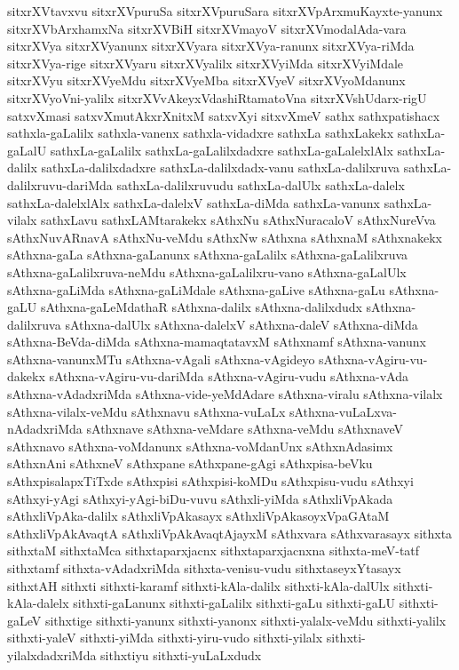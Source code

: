 {sitxrXVtavxvu
sitxrXVpuruSa
sitxrXVpuruSara
sitxrXVpArxmuKayxte-yanunx
sitxrXVbArxhamxNa
sitxrXVBiH
sitxrXVmayoV
sitxrXVmodalAda-vara
sitxrXVya
sitxrXVyanunx
sitxrXVyara
sitxrXVya-ranunx
sitxrXVya-riMda
sitxrXVya-rige
sitxrXVyaru
sitxrXVyalilx
sitxrXVyiMda
sitxrXVyiMdale
sitxrXVyu
sitxrXVyeMdu
sitxrXVyeMba
sitxrXVyeV
sitxrXVyoMdanunx
sitxrXVyoVni-yalilx
sitxrXVvAkeyxVdashiRtamatoVna
sitxrXVshUdarx-rigU
satxvXmasi
satxvXmutAkxrXnitxM
satxvXyi
sitxvXmeV
sathx
sathxpatishacx
sathxla-gaLalilx
sathxla-vanenx
sathxla-vidadxre
sathxLa
sathxLakekx
sathxLa-gaLalU
sathxLa-gaLalilx
sathxLa-gaLalilxdadxre
sathxLa-gaLalelxlAlx
sathxLa-dalilx
sathxLa-dalilxdadxre
sathxLa-dalilxdadx-vanu
sathxLa-dalilxruva
sathxLa-dalilxruvu-dariMda
sathxLa-dalilxruvudu
sathxLa-dalUlx
sathxLa-dalelx
sathxLa-dalelxlAlx
sathxLa-dalelxV
sathxLa-diMda
sathxLa-vanunx
sathxLa-vilalx
sathxLavu
sathxLAMtarakekx
sAthxNu
sAthxNuracaloV
sAthxNureVva
sAthxNuvARnavA
sAthxNu-veMdu
sAthxNw
sAthxna
sAthxnaM
sAthxnakekx
sAthxna-gaLa
sAthxna-gaLanunx
sAthxna-gaLalilx
sAthxna-gaLalilxruva
sAthxna-gaLalilxruva-neMdu
sAthxna-gaLalilxru-vano
sAthxna-gaLalUlx
sAthxna-gaLiMda
sAthxna-gaLiMdale
sAthxna-gaLive
sAthxna-gaLu
sAthxna-gaLU
sAthxna-gaLeMdathaR
sAthxna-dalilx
sAthxna-dalilxdudx
sAthxna-dalilxruva
sAthxna-dalUlx
sAthxna-dalelxV
sAthxna-daleV
sAthxna-diMda
sAthxna-BeVda-diMda
sAthxna-mamaqtatavxM
sAthxnamf
sAthxna-vanunx
sAthxna-vanunxMTu
sAthxna-vAgali
sAthxna-vAgideyo
sAthxna-vAgiru-vu-dakekx
sAthxna-vAgiru-vu-dariMda
sAthxna-vAgiru-vudu
sAthxna-vAda
sAthxna-vAdadxriMda
sAthxna-vide-yeMdAdare
sAthxna-viralu
sAthxna-vilalx
sAthxna-vilalx-veMdu
sAthxnavu
sAthxna-vuLaLx
sAthxna-vuLaLxva-nAdadxriMda
sAthxnave
sAthxna-veMdare
sAthxna-veMdu
sAthxnaveV
sAthxnavo
sAthxna-voMdanunx
sAthxna-voMdanUnx
sAthxnAdasimx
sAthxnAni
sAthxneV
sAthxpane
sAthxpane-gAgi
sAthxpisa-beVku
sAthxpisalapxTiTxde
sAthxpisi
sAthxpisi-koMDu
sAthxpisu-vudu
sAthxyi
sAthxyi-yAgi
sAthxyi-yAgi-biDu-vuvu
sAthxli-yiMda
sAthxliVpAkada
sAthxliVpAka-dalilx
sAthxliVpAkasayx
sAthxliVpAkasoyxVpaGAtaM
sAthxliVpAkAvaqtA
sAthxliVpAkAvaqtAjayxM
sAthxvara
sAthxvarasayx
sithxta
sithxtaM
sithxtaMca
sithxtaparxjacnx
sithxtaparxjacnxna
sithxta-meV-tatf
sithxtamf
sithxta-vAdadxriMda
sithxta-venisu-vudu
sithxtaseyxYtasayx
sithxtAH
sithxti
sithxti-karamf
sithxti-kAla-dalilx
sithxti-kAla-dalUlx
sithxti-kAla-dalelx
sithxti-gaLanunx
sithxti-gaLalilx
sithxti-gaLu
sithxti-gaLU
sithxti-gaLeV
sithxtige
sithxti-yanunx
sithxti-yanonx
sithxti-yalalx-veMdu
sithxti-yalilx
sithxti-yaleV
sithxti-yiMda
sithxti-yiru-vudo
sithxti-yilalx
sithxti-yilalxdadxriMda
sithxtiyu
sithxti-yuLaLxdudx
}
